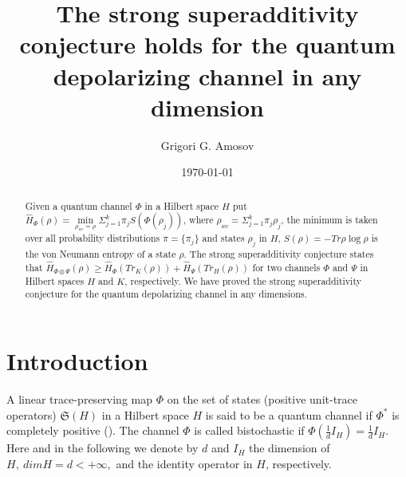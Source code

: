 \documentclass[twocolumn,showpacs,preprintnumbers,amsmath,amssymb]{revtex4}
\begin{document}
\title {The strong superadditivity conjecture holds for the quantum depolarizing channel in any dimension}

\author {Grigori G. Amosov}





\date{\today}


\begin {abstract}
Given a quantum channel $\Phi $ in a Hilbert space $H$ put $\hat
H_{\Phi}(\rho)=\min \limits _{\rho _{av}=\rho }\Sigma
_{j=1}^{k}\pi _{j}S(\Phi (\rho _{j}))$, where $\rho _{av}=\Sigma
_{j=1}^{k}\pi _{j}\rho _{j}$, the minimum is taken over all
probability distributions $\pi =\{\pi _{j}\}$ and states $\rho
_{j}$ in $H$, $S(\rho)=-Tr\rho\log\rho$ is the von Neumann
entropy of a state $\rho$. The strong superadditivity conjecture
states that $\hat H_{\Phi \otimes \Psi}(\rho)\ge \hat
H_{\Phi}(Tr_{K}(\rho))+\hat H_{\Psi}(Tr_{H}(\rho))$ for two
channels $\Phi $ and $\Psi $ in Hilbert spaces $H$ and $K$,
respectively. We have proved the strong superadditivity
conjecture for the quantum depolarizing channel in any dimensions.


\end {abstract}


\maketitle

\section {Introduction}

A linear trace-preserving map $\Phi $ on the set of states
(positive unit-trace operators) $\mathfrak{S}(H)$ in a Hilbert
space $H$ is said to be a quantum channel if $\Phi ^{*}$ is
completely positive (\cite {Hol}). The channel $\Phi $ is called
bistochastic if $\Phi (\frac {1}{d}I_{H})=\frac {1}{d}I_{H}$.
Here and in the following we denote by $d$ and $I_{H}$ the
dimension of $H,\ dimH=d<+\infty ,$ and the identity operator in
$H$, respectively.
\end{document}
